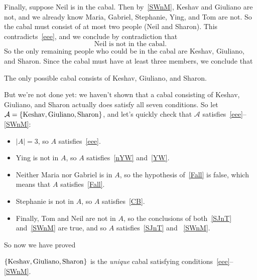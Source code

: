 \documentclass[12pt]{article}
\newcommand{\card}[1]{\left|#1\right|}
\begin{document}
{Finally, suppose Neil is in the cabal.  Then by~\eqref{SWnM},
Keshav and Giuliano are not, and we already know Maria, Gabriel, Stephanie,
Ying, and Tom are not. So the cabal must consist of at most two
people (Neil and Sharon). This contradicts~\eqref{eee}, and we conclude
by contradiction that
\begin{equation}\label{nM}
\text{Neil is not in the cabal.}
\end{equation}
So the only remaining people who could be in the cabal are Keshav,
Giuliano, and Sharon.  Since the cabal must have at least three members,
we conclude that
\begin{lemma}
The only possible cabal consists of Keshav, Giuliano, and Sharon.
\end{lemma}

But we're not done yet: we haven't shown that a cabal consisting of
Keshav, Giuliano, and Sharon actually does satisfy all seven conditions.
So let $\mathcal{A} =\left\{\text{Keshav}, \text{Giuliano},
  \text{Sharon}\right\}$, and let's quickly check that $\mathcal{A}$
satisfies~\eqref{eee}--\eqref{SWnM}:

\begin{itemize}

\item $\card{A} = 3$, so $A$ satisfies~\eqref{eee}.
\item Ying is not in $A$, so $A$ satisfies~\eqref{nYW} and~\eqref{YW}.
\item Neither Maria nor Gabriel is in $A$, so the hypothesis
  of~\eqref{Fall} is false, which means that $A$
  satisfies~\eqref{Fall}.
\item Stephanie is not in $A$, so $A$ satisfies~\eqref{CB}.
\item Finally, Tom and Neil are not in $A$, so the conclusions of
both~\eqref{SJnT} and~\eqref{SWnM} are true, and so $A$
satisfies~\eqref{SJnT} and ~\eqref{SWnM}.

\end{itemize}

So now we have proved
\begin{proposition*}
$\left\{\text{Keshav}, \text{Giuliano}, \text{Sharon}\right\}$ is the \emph{unique} cabal
satisfying conditions~\eqref{eee}--\eqref{SWnM}.
\end{proposition*}}
\end{document}
